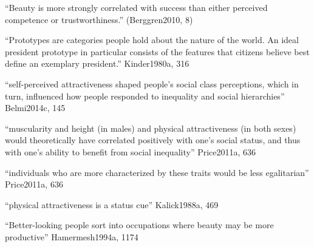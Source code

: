 		``Beauty is more strongly correlated with success than either perceived competence or trustworthiness.'' (Berggren2010, 8)

		``Prototypes are categories people hold about the nature of the world. An ideal president prototype in particular consists of the features that citizens believe best define an exemplary president.'' Kinder1980a, 316



``self-perceived attractiveness shaped people's social class perceptions, which in turn, influenced how people responded to inequality and social hierarchies'' Belmi2014c, 145

``muscularity and height (in males) and physical attractiveness (in both sexes) would theoretically have correlated positively with one’s social status, and thus with one's ability to benefit from social inequality'' Price2011a, 636

``individuals who are more characterized by these traits would be less egalitarian'' Price2011a, 636

``physical attractiveness is a status cue'' Kalick1988a, 469

``Better-looking people sort into occupations where beauty may be more productive'' Hamermesh1994a, 1174







	














